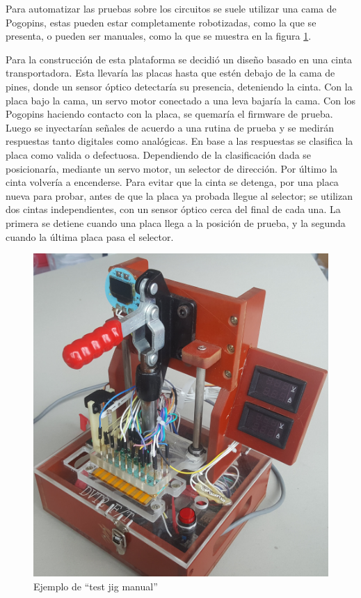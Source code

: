 \documentclass[12pt,letterpaper]{article}     %
\begin{document}
Para automatizar las pruebas sobre los circuitos se suele utilizar una cama de Pogopins, 
estas pueden estar completamente robotizadas, como la que se presenta, o pueden ser manuales,
como la que se muestra en la figura \ref{fig:pogojig}.

Para la construcción de esta plataforma se decidió un diseño basado en una cinta transportadora.
Esta llevaría las placas hasta que estén debajo de la cama de pines, donde un sensor óptico detectaría 
su presencia, deteniendo la cinta. Con la placa bajo la cama, un servo motor conectado a una leva 
bajaría la cama. Con los Pogopins haciendo contacto con la placa, se quemaría el firmware de prueba.
Luego se inyectarían señales de acuerdo a una rutina de prueba y se medirán respuestas tanto digitales
como analógicas. En base a las respuestas se clasifica la placa como valida o defectuosa. Dependiendo 
de la clasificación dada se posicionaría, mediante un servo motor, un selector de dirección. Por último
la cinta volvería a encenderse. Para evitar que la cinta se detenga, por una placa nueva para probar,
antes de que la placa ya probada llegue al selector; se utilizan dos cintas independientes, 
con un sensor óptico cerca del final de cada una. La primera se detiene cuando una placa llega a la
posición de prueba, y la segunda cuando la última placa pasa el selector.

\begin{figure}[!ht]
\centering
\includegraphics[scale=0.1]{imagenes/pogojig.jpg}
\caption{Ejemplo de ``test jig manual''}
\label{fig:pogojig}
\end{figure}
\end{document}
